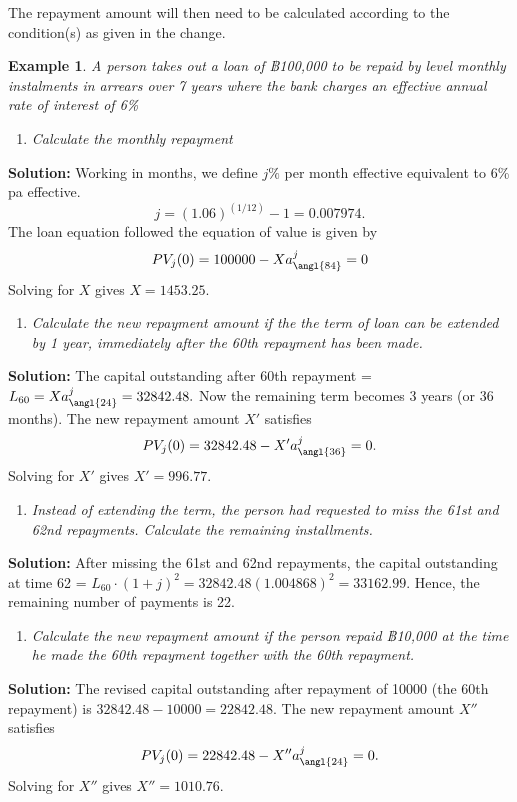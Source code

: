 \documentclass[
]{book}
\providecommand{\tightlist}{%
  \setlength{\itemsep}{0pt}\setlength{\parskip}{0pt}}
\theoremstyle{definition}
\theoremstyle{definition}
\newtheorem{example}{Example}[chapter]
\theoremstyle{definition}
\theoremstyle{definition}
\theoremstyle{remark}
\begin{document}
The repayment amount will then need to be calculated according to the
condition(s) as given in the change.

\begin{example}
\emph{A person takes out a loan of ฿100,000 to be repaid by level monthly
instalments in arrears over 7 years where the bank charges an effective
annual rate of interest of 6\%}

\begin{enumerate}
\def\labelenumi{\arabic{enumi}.}
\tightlist
\item
  \emph{Calculate the monthly repayment}
\end{enumerate}

\textbf{Solution:} Working in months, we
define \(j\%\) per month effective equivalent to 6\% pa effective.
\[j = (1.06)^{(1/12)} - 1 = 0.007974.\] The loan equation followed
the equation of value is given by
\[PV_j(0) = 100000 - X a^j_{\angl{84}} = 0\] Solving for \(X\) gives
\(X =1453.25\).

\begin{enumerate}
\def\labelenumi{\arabic{enumi}.}
\setcounter{enumi}{1}
\tightlist
\item
  \emph{Calculate the new repayment amount if the the term of loan can be
  extended by 1 year, immediately after the 60th repayment has been
  made. }
\end{enumerate}

\textbf{Solution:} The capital outstanding after 60th repayment =
\(L_{60} = X a^j_{\angl{24}} = 32842.48.\) Now the remaining term
becomes 3 years (or 36 months). The new repayment amount \(X'\)
satisfies \[PV_j(0) = 32842.48 - X' a^j_{\angl{36}} = 0.\] Solving
for \(X'\) gives \(X' = 996.77\).

\begin{enumerate}
\def\labelenumi{\arabic{enumi}.}
\setcounter{enumi}{2}
\tightlist
\item
  \emph{Instead of extending the term, the person had requested to miss the
  61st and 62nd repayments. Calculate the remaining installments.}
\end{enumerate}

\textbf{Solution:} After missing the 61st and 62nd repayments, the
capital outstanding at time 62 =
\(L_{60}\cdot (1+j)^2 = 32842.48 (1.004868)^2 = 33162.99.\) Hence, the
remaining number of payments is 22.

\begin{enumerate}
\def\labelenumi{\arabic{enumi}.}
\setcounter{enumi}{3}
\tightlist
\item
  \emph{Calculate the new repayment amount if the person repaid ฿10,000 at the time he made the 60th repayment together with the 60th repayment.}
\end{enumerate}

\textbf{Solution:} The revised capital outstanding after
repayment of 10000 (the 60th repayment) is
\(32842.48 - 10000 = 22842.48.\) The new repayment amount \(X''\)
satisfies \[PV_j(0) = 22842.48 - X'' a^j_{\angl{24}} = 0.\] Solving
for \(X''\) gives \(X'' = 1010.76\).
\end{example}
\end{document}
